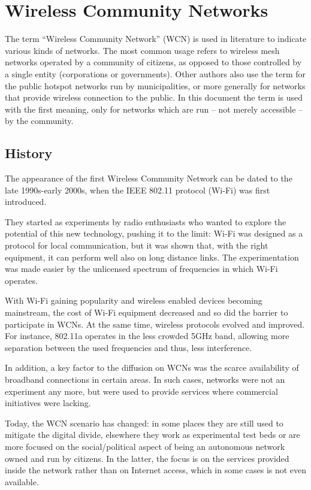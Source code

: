 \documentclass[a4paper,11pt,twoside,openright]{memoir}
\begin{document}
\chapter{Wireless Community Networks}\label{wireless-community-networks}

The term ``Wireless Community Network'' (WCN) is used in literature to
indicate various kinds of networks. The most common usage refers to
wireless mesh networks operated by a community of citizens, as opposed
to those controlled by a single entity (corporations or governments).
Other authors also use the term for the public hotspot networks run by
municipalities, or more generally for networks that provide wireless
connection to the public. In this document the term is used with the
first meaning, only for networks which are run -- not merely accessible
-- by the community.


\section{History}\label{history}

The appearance of the first Wireless Community Network can be dated to
the late 1990s-early 2000s, when the IEEE 802.11 protocol (Wi-Fi) was
first introduced.

They started as experiments by radio enthusiasts who
wanted to explore the potential of this new technology, pushing it to
the limit: Wi-Fi was designed as a protocol for local communication, but
it was shown that, with the right equipment, it can perform well also on
long distance links. The experimentation was made easier by the
unlicensed spectrum of frequencies in which Wi-Fi operates.

With Wi-Fi gaining popularity and wireless enabled devices becoming
mainstream, the cost of Wi-Fi equipment decreased and so did the barrier
to participate in WCNs. At the same time, wireless protocols evolved and
improved. For instance, 802.11a operates in the less crowded 5GHz band,
allowing more separation between the used frequencies and thus, less
interference.

In addition, a key factor to the diffusion on WCNs was the
scarce availability of broadband connections in certain areas. In such
cases, networks were not an experiment any more, but were used to provide
services where commercial initiatives were lacking.

Today, the WCN scenario has changed: in some places they are still used to
mitigate the digital divide, elsewhere they work as experimental
test beds or are more focused on the social/political aspect of being an
autonomous network owned and run by citizens. In the latter, the focus
is on the services provided inside the network rather than on Internet
access, which in some cases is not even available.
\end{document}
